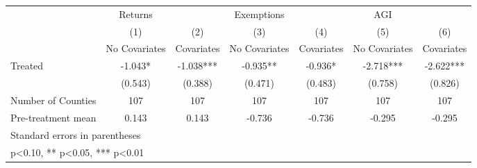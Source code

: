 {
\def\sym#1{\ifmmode^{#1}\else\(^{#1}\)\fi}
\begin{tabular}{l*{6}{c}}
\hline\hline
            &     Returns   &               &  Exemptions   &               &         AGI   &               \\
            &\multicolumn{1}{c}{(1)}&\multicolumn{1}{c}{(2)}&\multicolumn{1}{c}{(3)}&\multicolumn{1}{c}{(4)}&\multicolumn{1}{c}{(5)}&\multicolumn{1}{c}{(6)}\\
            &\multicolumn{1}{c}{No Covariates}&\multicolumn{1}{c}{Covariates}&\multicolumn{1}{c}{No Covariates}&\multicolumn{1}{c}{Covariates}&\multicolumn{1}{c}{No Covariates}&\multicolumn{1}{c}{Covariates}\\
\hline
Treated     &      -1.043*  &      -1.038***&      -0.935** &      -0.936*  &      -2.718***&      -2.622***\\
            &     (0.543)   &     (0.388)   &     (0.471)   &     (0.483)   &     (0.758)   &     (0.826)   \\
\hline
Number of Counties&         107   &         107   &         107   &         107   &         107   &         107   \\
Pre-treatment mean&       0.143   &       0.143   &      -0.736   &      -0.736   &      -0.295   &      -0.295   \\
\hline\hline
\multicolumn{7}{l}{\footnotesize Standard errors in parentheses}\\
\multicolumn{7}{l}{\footnotesize * p<0.10, ** p<0.05, *** p<0.01}\\
\end{tabular}
}
